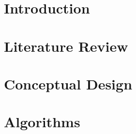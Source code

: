 



\frenchspacing
\raggedbottom
{} %
\pagestyle{plain}

%

\cleardoublepage
\cleardoublepage
\cleardoublepage
\cleardoublepage
\pagestyle{scrheadings}
\cleardoublepage
\cleardoublepage
\part{Introduction}

\part{Literature Review}

\cleardoublepage
\part{Conceptual Design}

\part{Algorithms} \label{part:algo}

